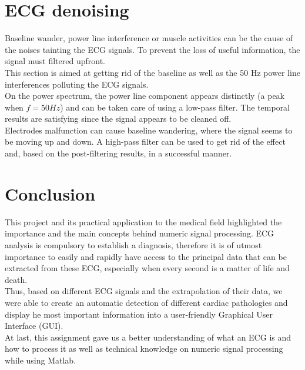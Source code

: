 \documentclass[11pt]{article}
\begin{document}
\section{ECG denoising}
	Baseline wander, power line interference or muscle activities can be the cause of the noises tainting the ECG signals. To prevent the loss of useful information, the signal must filtered upfront. \\
	This section is aimed at getting rid of the baseline as well as the 50 Hz power line interferences polluting the ECG signals.\\
	On the power spectrum, the power line component appears distinctly (a peak when $f=50 Hz$) and can be taken care of using a low-pass filter. The temporal results are satisfying since the signal appears to be cleaned off.\\
	Electrodes malfunction can cause baseline wandering, where the signal seems to be moving up and down. A high-pass filter can be used to get rid of the effect and, based on the post-filtering results, in a successful manner.

\section{Conclusion}
	This project and its practical application to the medical field highlighted the importance and the main concepts behind numeric signal processing. ECG analysis is compulsory to establish a diagnosis, therefore it is of utmost importance to easily and rapidly have access to the principal data that can be extracted from these ECG, especially when every second is a matter of life and death.\\
	Thus, based on different ECG signals and the extrapolation of their data, we were able to create an automatic detection of different cardiac pathologies and display he most important information into a user-friendly Graphical User Interface (GUI).\\
	At last, this assignment gave us a better understanding of what an ECG is and how to process it as well as technical knowledge on numeric signal processing while using Matlab.\\
\end{document}
